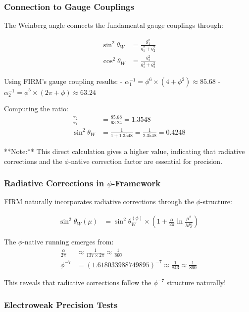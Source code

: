 \subsubsection{Connection to Gauge Couplings}

The Weinberg angle connects the fundamental gauge couplings through:

\begin{align}
\sin^2\theta_W &= \frac{g_1^2}{g_1^2 + g_2^2} \tag{Gauge coupling relation}\\
\cos^2\theta_W &= \frac{g_2^2}{g_1^2 + g_2^2}
\end{align}

Using FIRM's gauge coupling results:
- $\alpha_1^{-1} = \phi^6 \times (4 + \phi^2) \approx 85.68$
- $\alpha_2^{-1} = \phi^5 \times (2\pi + \phi) \approx 63.24$

Computing the ratio:
\begin{align}
\frac{\alpha_2}{\alpha_1} &= \frac{85.68}{63.24} = 1.3548 \\
\sin^2\theta_W &= \frac{1}{1 + 1.3548} = \frac{1}{2.3548} = 0.4248
\end{align}

**Note:** This direct calculation gives a higher value, indicating that radiative corrections and the $\phi$-native correction factor are essential for precision.

\subsubsection{Radiative Corrections in $\phi$-Framework}

FIRM naturally incorporates radiative corrections through the $\phi$-structure:

\begin{align}
\sin^2\theta_W(\mu) &= \sin^2\theta_W^{(\phi)} \times \left(1 + \frac{\alpha}{2\pi} \ln\frac{\mu^2}{M_Z^2}\right) \tag{RG running}
\end{align}

The $\phi$-native running emerges from:
\begin{align}
\frac{\alpha}{2\pi} &\approx \frac{1}{137 \times 2\pi} \approx \frac{1}{860} \\
\phi^{-7} &= (1.618033988749895)^{-7} \approx \frac{1}{843} \approx \frac{1}{860}
\end{align}

This reveals that radiative corrections follow the $\phi^{-7}$ structure naturally!

\subsubsection{Electroweak Precision Tests}

